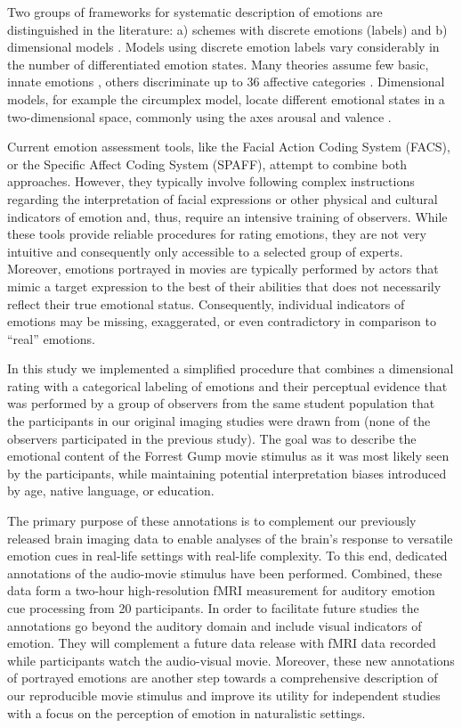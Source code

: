 Two groups of frameworks for systematic description of emotions are
distinguished in the literature: a) schemes with discrete emotions (labels) and
b) dimensional models \cite{GW2007}.  Models using discrete emotion labels vary
considerably in the number of differentiated emotion states. Many theories
assume few basic, innate emotions \cite{Ekm1992a}, others discriminate up to
36 affective categories \cite{Sch2005}.  Dimensional models, for example the
circumplex model, locate different emotional states in a two-dimensional
space, commonly using the axes arousal and valence \cite{Rus1980}.

Current emotion assessment tools, like the Facial Action Coding System (FACS),
or the Specific Affect Coding System (SPAFF)\cite{CG2007}, attempt to combine
both approaches. However, they typically involve following complex instructions
regarding the interpretation of facial expressions or other physical and
cultural indicators of emotion\cite[p. 281]{CG2007} and, thus, require an
intensive training of observers. While these tools provide reliable procedures
for rating emotions, they are not very intuitive and consequently only
accessible to a selected group of experts. Moreover, emotions portrayed in
movies are typically performed by actors that mimic a target expression to the
best of their abilities that does not necessarily reflect their true emotional
status.  Consequently, individual indicators of emotions may be missing,
exaggerated, or even contradictory in comparison to ``real'' emotions.

In this study we implemented a simplified procedure that combines a dimensional
rating with a categorical labeling of emotions and their perceptual evidence
that was performed by a group of observers from the same student population
that the participants in our original imaging studies were drawn
from\cite{HBI+14} (none of the observers participated in the previous study).
The goal was to describe the emotional content of the Forrest Gump movie
stimulus as it was most likely seen by the participants, while maintaining
potential interpretation biases introduced by age, native language, or
education.

The primary purpose of these annotations is to complement our previously
released brain imaging data to enable analyses of the brain's response to
versatile emotion cues in real-life settings with real-life complexity. To this
end, dedicated annotations of the audio-movie stimulus have been performed.
Combined, these data form a two-hour high-resolution fMRI measurement for
auditory emotion cue processing from 20 participants. In order to facilitate
future studies the annotations go beyond the auditory domain and include
visual indicators of emotion. They will complement a future data release with
fMRI data recorded while participants watch the audio-visual movie.  Moreover,
these new annotations of portrayed emotions are another step towards a
comprehensive description of our reproducible movie stimulus\cite{HBI+14} and
improve its utility for independent studies with a focus on the perception of
emotion in naturalistic settings.


